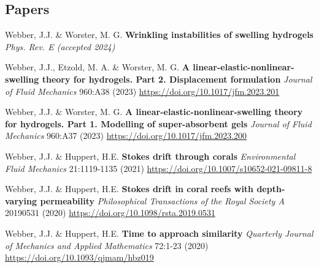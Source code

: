 \documentclass[a4paper]{article}
\begin{document}
    \begin{multicols}{2}
        \subsection*{Papers}
            \begin{small}
                \begin{itemize}
                    {\color{gray}\item Webber, J.J. \& Worster, M. G. \textbf{Wrinkling instabilities of swelling hydrogels} \emph{Phys. Rev. E (accepted 2024)}}
                    \item Webber, J.J., Etzold, M. A. \& Worster, M. G. \textbf{A linear-elastic-nonlinear-swelling theory for hydrogels. Part 2. Displacement formulation} \emph{Journal of Fluid Mechanics} 960:A38 (2023) \href{https://doi.org/10.1017/jfm.2023.201}{https://doi.org/10.1017/jfm.2023.201}
                    \item Webber, J.J. \& Worster, M. G. \textbf{A linear-elastic-nonlinear-swelling theory for hydrogels. Part 1. Modelling of super-absorbent gels} \emph{Journal of Fluid Mechanics} 960:A37 (2023) \href{https://doi.org/10.1017/jfm.2023.200}{https://doi.org/10.1017/jfm.2023.200}
                    \item Webber, J.J. \& Huppert, H.E. \textbf{Stokes drift through corals} \emph{Environmental Fluid Mechanics} 21:1119-1135 (2021) \href{https://doi.org/10.1007/s10652-021-09811-8}{https://doi.org/10.1007/s10652-021-09811-8}
                    \item Webber, J.J. \& Huppert, H.E. \textbf{Stokes drift in coral reefs with depth-varying permeability} \emph{Philosophical Transactions of the Royal Society A} 20190531 (2020) \href{https://doi.org/10.1098/rsta.2019.0531}{https://doi.org/10.1098/rsta.2019.0531}
                    \item Webber, J.J. \& Huppert, H.E. \textbf{Time to approach similarity} \emph{Quarterly Journal of Mechanics and Applied Mathematics} 72:1-23 (2020) \href{https://doi.org/10.1093/qjmam/hbz019}{https://doi.org/10.1093/qjmam/hbz019}
                \end{itemize}
            \end{small}
        

\end{multicols}
\end{document}

